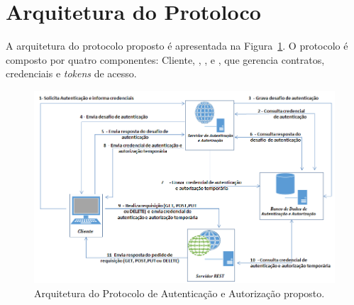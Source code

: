 


\section{Arquitetura do Protoloco}\label{sec:ArqProtocolo}

A arquitetura do protocolo proposto é apresentada na Figura~\ref{fig:arquiteturaprotocolo}. O protocolo é composto por quatro componentes: Cliente, \servidorAA, \servidorRest, e \servidorBD, que gerencia contratos, credenciais e \emph{tokens} de acesso.

\begin{figure}[!htb]
    \centering
    \includegraphics[width=1.0\textwidth]{arquitetura_protocolo.png}
    \caption{Arquitetura do Protocolo de Autenticação e Autorização proposto.}
    \label{fig:arquiteturaprotocolo}
\end{figure}

